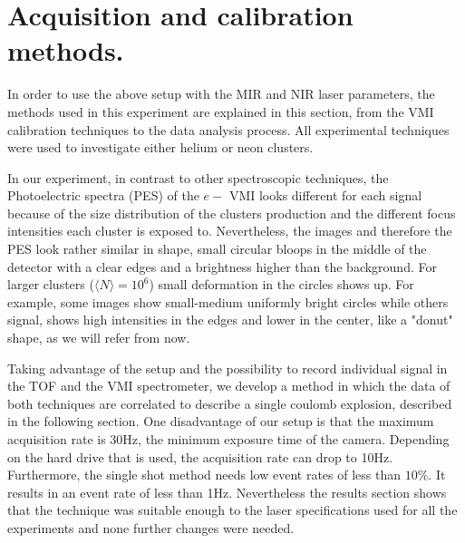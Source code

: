 \chapter{Acquisition and calibration methods.}

In order to use the above setup with the MIR and NIR laser parameters, the methods used in this experiment are explained in this section, from the VMI calibration techniques to the data analysis process. All experimental techniques were used to investigate either helium or neon clusters. 

In our experiment, in contrast to other spectroscopic techniques, the Photoelectric spectra (PES) of the $e-$ VMI looks different for each signal because of the size distribution of the clusters production and the different focus intensities each cluster is exposed to. Nevertheless, the images and therefore the PES look rather similar in shape, small circular bloops in the middle of the detector with a clear edges and a brightness higher than the background. For larger clusters ($\langle N \rangle = 10^{6}$) small deformation in the circles shows up. For example, some images show small-medium  uniformly bright circles  while others signal, shows high intensities in the edges and lower in the center, like a "donut" shape, as we will refer from now.

Taking advantage of the setup and the possibility to record individual signal in the TOF and the VMI spectrometer, we develop a method in which the data of both techniques are correlated to describe a single coulomb explosion, described in the following section.
One disadvantage of our setup is that the maximum acquisition rate is 30Hz, the minimum exposure time of the camera. Depending on the hard drive that is used, the acquisition rate can drop to 10Hz. Furthermore, the single shot method needs low event rates of less than $10\%$. It results in an event rate of less than 1Hz. Nevertheless the results section shows that the technique was suitable enough to the laser specifications used for all the experiments and none further changes were needed.

